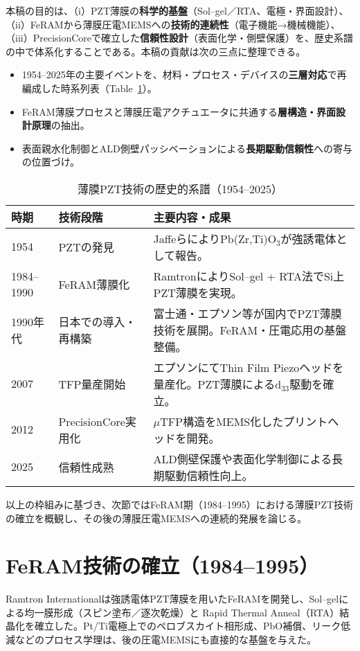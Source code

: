 \documentclass[conference]{IEEEtran}
\begin{document}
本稿の目的は、（i）PZT薄膜の\textbf{科学的基盤}（Sol--gel／RTA、電極・界面設計）、（ii）FeRAMから薄膜圧電MEMSへの\textbf{技術的連続性}（電子機能→機械機能）、（iii）PrecisionCoreで確立した\textbf{信頼性設計}（表面化学・側壁保護）を、歴史系譜の中で体系化することである。本稿の貢献は次の三点に整理できる。
\begin{itemize}
  \item 1954--2025年の主要イベントを、材料・プロセス・デバイスの\textbf{三層対応}で再編成した時系列表（Table~\ref{tab:timeline}）。
  \item FeRAM薄膜プロセスと薄膜圧電アクチュエータに共通する\textbf{層構造・界面設計原理}の抽出。
  \item 表面親水化制御とALD側壁パッシベーションによる\textbf{長期駆動信頼性}への寄与の位置づけ。
\end{itemize}

\begin{table}[!t]
\centering
\caption{薄膜PZT技術の歴史的系譜（1954--2025）}
\label{tab:timeline}
\renewcommand{\arraystretch}{1.15}
\begin{tabular}{@{}llp{4.2cm}@{}}
\toprule
\textbf{時期} & \textbf{技術段階} & \textbf{主要内容・成果} \\ \midrule
1954 & PZTの発見 &
JaffeらによりPb(Zr,Ti)O$_3$が強誘電体として報告\cite{jaffe1954}。 \\[2pt]
1984--1990 & FeRAM薄膜化 &
RamtronによりSol--gel + RTA法でSi上PZT薄膜を実現\cite{ramtron_iedm1989}。\\[2pt]
1990年代 & 日本での導入・再構築 &
富士通・エプソン等が国内でPZT薄膜技術を展開。FeRAM・圧電応用の基盤整備。\\[2pt]
2007 & TFP量産開始 &
エプソンにてThin Film Piezoヘッドを量産化。PZT薄膜によるd$_{33}$駆動を確立。\\[2pt]
2012 & PrecisionCore実用化 &
$\mu$TFP構造をMEMS化したプリントヘッドを開発\cite{uemura2014mems}。\\[2pt]
2025 & 信頼性成熟 &
ALD側壁保護や表面化学制御による長期駆動信頼性向上。\\
\bottomrule
\end{tabular}
\end{table}

以上の枠組みに基づき、次節ではFeRAM期（1984--1995）における薄膜PZT技術の確立を概観し、その後の薄膜圧電MEMSへの連続的発展を論じる。

\section{FeRAM技術の確立（1984--1995）}
Ramtron Internationalは強誘電体PZT薄膜を用いたFeRAMを開発し、Sol--gelによる均一膜形成（スピン塗布／逐次乾燥）と Rapid Thermal Anneal（RTA）結晶化を確立した\cite{ramtron_iedm1989,bottaro1993solgel}。Pt/Ti電極上でのペロブスカイト相形成、PbO補償、リーク低減などのプロセス学理は、後の圧電MEMSにも直接的な基盤を与えた\cite{scott2000review}。
\end{document}
